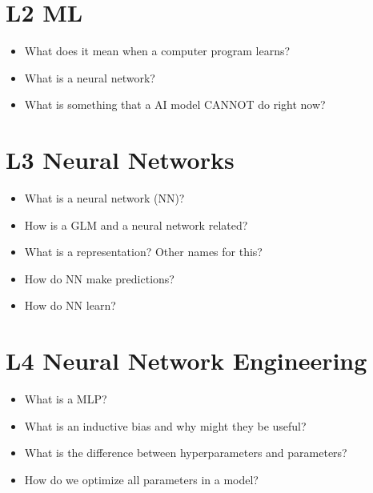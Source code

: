 \documentclass{article}
\begin{document}
\begin{definition}
    
\end{definition}

\begin{example}
    
\end{example}

\section{L2 ML}
\begin{summary}
    \begin{itemize}
        \item What does it mean when a computer program learns?
        \item What is a neural network?
        \item What is something that a AI model CANNOT do right now?
    \end{itemize}
\end{summary}

\section{L3 Neural Networks}
\begin{summary}
    \begin{itemize}
        \item What is a neural network (NN)?
        \item How is a GLM and a neural network related?
        \item What is a representation? Other names for this?
        \item How do NN make predictions?
        \item How do NN learn?
    \end{itemize}
\end{summary}

\section{L4 Neural Network Engineering}
\begin{summary}
    \begin{itemize}
        \item What is a MLP?
        \item What is an inductive bias and why might they be useful?
        \item What is the difference between hyperparameters and parameters?
        \item How do we optimize all parameters in a model?
    \end{itemize}
\end{summary}
\end{document}
